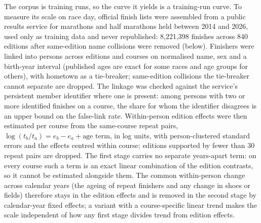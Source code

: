 \documentclass[11pt]{article}
\renewcommand{\_}{\textunderscore\allowbreak}
\begin{document}
The corpus is training runs, so the curve it yields is a training-run curve. To measure its scale on race day, official finish lists were assembled from a public results service for marathons and half marathons held between 2014 and 2026, used only as training data and never republished: 8{,}221{,}398 finishes across 840 editions after same-edition name collisions were removed (below). Finishers were linked into persons across editions and courses on normalised name, sex and a birth-year interval (published ages are exact for some races and age groups for others), with hometown as a tie-breaker; same-edition collisions the tie-breaker cannot separate are dropped. The linkage was checked against the service's persistent member identifier where one is present: among persons with two or more identified finishes on a course, the share for whom the identifier disagrees is an upper bound on the false-link rate. Within-person edition effects were then estimated per course from the same-course repeat pairs, $\log(t_b/t_a) = e_b - e_a + \text{age term}$, in log units, with person-clustered standard errors and the effects centred within course; editions supported by fewer than 30 repeat pairs are dropped. The first stage carries no separate years-apart term: on every course such a term is an exact linear combination of the edition contrasts, so it cannot be estimated alongside them. The common within-person change across calendar years (the ageing of repeat finishers and any change in shoes or fields) therefore stays in the edition effects and is removed in the second stage by calendar-year fixed effects; a variant with a course-specific linear trend makes the scale independent of how any first stage divides trend from edition effects.
\end{document}
